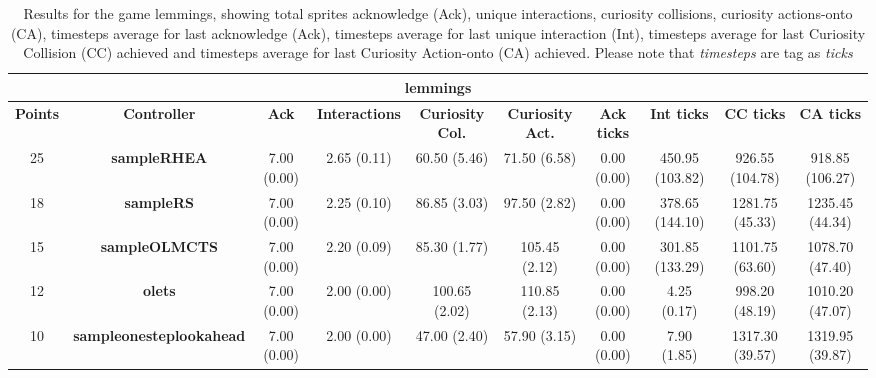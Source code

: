 \begin{table*}[!t]
\begin{center}
\begin{adjustbox}{width=1\textwidth}
\begin{tabular}{|c|c|c|c|c|c|c|c|c|c|}
\multicolumn{10}{c}{\textbf{lemmings}}\\
\hline
\textbf{Points} & \textbf{Controller} & \textbf{Ack} & \textbf{Interactions} & \textbf{Curiosity Col.} & \textbf{Curiosity Act.} & \textbf{Ack ticks} & \textbf{Int ticks} & \textbf{CC ticks} & \textbf{CA ticks}\\
\hline
25 & \textbf{sampleRHEA} & 7.00 (0.00) & 2.65 (0.11) & 60.50 (5.46) & 71.50 (6.58) & 0.00 (0.00) & 450.95 (103.82) & 926.55 (104.78) & 918.85 (106.27)
 \\
\hline
18 & \textbf{sampleRS} & 7.00 (0.00) & 2.25 (0.10) & 86.85 (3.03) & 97.50 (2.82) & 0.00 (0.00) & 378.65 (144.10) & 1281.75 (45.33) & 1235.45 (44.34)
 \\
\hline
15 & \textbf{sampleOLMCTS} & 7.00 (0.00) & 2.20 (0.09) & 85.30 (1.77) & 105.45 (2.12) & 0.00 (0.00) & 301.85 (133.29) & 1101.75 (63.60) & 1078.70 (47.40)
 \\
\hline
12 & \textbf{olets} & 7.00 (0.00) & 2.00 (0.00) & 100.65 (2.02) & 110.85 (2.13) & 0.00 (0.00) & 4.25 (0.17) & 998.20 (48.19) & 1010.20 (47.07)
 \\
\hline
10 & \textbf{sampleonesteplookahead} & 7.00 (0.00) & 2.00 (0.00) & 47.00 (2.40) & 57.90 (3.15) & 0.00 (0.00) & 7.90 (1.85) & 1317.30 (39.57) & 1319.95 (39.87)
 \\
\hline
\end{tabular}
\end{adjustbox}
\caption{Results for the game lemmings, showing total sprites acknowledge (Ack), unique interactions, curiosity collisions, curiosity actions-onto (CA), timesteps average for last acknowledge (Ack),  timesteps average for last unique interaction (Int), timesteps average for last Curiosity Collision (CC) achieved and timesteps average for last Curiosity Action-onto (CA) achieved. Please note that \textit{timesteps} are tag as \textit{ticks}}
\label{tab:weights}
\end{center}
\end{table*}
